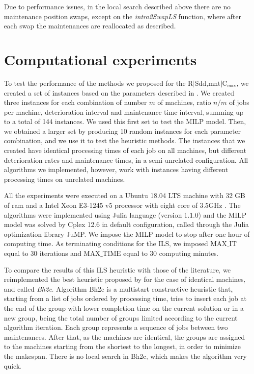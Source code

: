 \documentclass[a4paper,11pt]{article}
\begin{document}
Due to performance issues, in the local search described above there are no maintenance position swaps, except on the \emph{intra2SwapLS} function, where after each swap the maintenances are reallocated as described. %

\section{Computational experiments} \label{sec:results}%

To test the performance of the methods we proposed for the R$|$Sdd,mnt$|$C$_{\max}$, we created a set of instances based on the parameters described in \cite{ruiz2017makespan}. We created three instances for each combination of number $m$ of machines, ratio $n/m$ of jobs per machine, deterioration interval and maintenance time interval, summing up to a total of 144 instances. We used this first set to test the MILP model. Then, we obtained a larger set by producing 10 random instances for each parameter combination, and we use it to test the heuristic methods. The instances that we created have identical processing times of each job on all machines, but different deterioration rates and maintenance times, in a semi-unrelated configuration. All algorithms we implemented, however, work with instances having different processing times on unrelated machines.  

All the experiments were executed on a Ubuntu 18.04 LTS machine with 32 GB of ram and a Intel Xeon E3-1245 v5 processor with eight core of 3.5GHz . The algorithms were implemented using Julia language (version 1.1.0) and the MILP model was solved by Cplex 12.6 in default configuration, called through the Julia optimization library JuMP. We impose the MILP model to stop after one hour of computing time. As terminating conditions for the ILS, we imposed $\text{MAX}\_\text{IT}$ equal to 30 iterations and $\text{MAX}\_\text{TIME}$ equal to $30$ computing minutes. 

To compare the results of this ILS heuristic with those of the literature, we reimplemented the best heuristic proposed by \cite{ruiz2017makespan} for the case of identical machines, and called \emph{Bh2c}. Algorithm Bh2c is a multistart constructive heuristic that, starting from a list of jobs ordered by processing time, tries to insert each job at the end of the group with lower completion time on the current solution or in a new group, being the total number of groups limited according to the current algorithm iteration. Each group represents a sequence of jobs between two maintenances. After that, as the machines are identical, the groups are assigned to the machines starting from the shortest to the longest, in order to minimize the makespan. There is no local search in Bh2c, which makes the algorithm very quick. 
\end{document}

